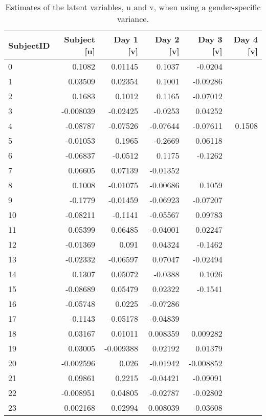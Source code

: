 \begin{table}[ht]
\centering
\caption{Estimates of the latent variables, u and v, when using a gender-specific variance.} 
\label{tab:uv_table2}
\begin{tabular}{lrrrrr}
  \hline
SubjectID & Subject [u] & Day 1 [v] & Day 2 [v] & Day 3 [v] & Day 4 [v] \\ 
  \hline
\hline
0 & 0.1082 & 0.01145 & 0.1037 & -0.0204 &  \\ 
  1 & 0.03509 & 0.02354 & 0.1001 & -0.09286 &  \\ 
  2 & 0.1683 & 0.1012 & 0.1165 & -0.07012 &  \\ 
  3 & -0.008039 & -0.02425 & -0.0253 & 0.04252 &  \\ 
  4 & -0.08787 & -0.07526 & -0.07644 & -0.07611 & 0.1508 \\ 
  5 & -0.01053 & 0.1965 & -0.2669 & 0.06118 &  \\ 
  6 & -0.06837 & -0.0512 & 0.1175 & -0.1262 &  \\ 
  7 & 0.06605 & 0.07139 & -0.01352 &  &  \\ 
  8 & 0.1008 & -0.01075 & -0.00686 & 0.1059 &  \\ 
  9 & -0.1779 & -0.01459 & -0.06923 & -0.07207 &  \\ 
  10 & -0.08211 & -0.1141 & -0.05567 & 0.09783 &  \\ 
  11 & 0.05399 & 0.06485 & -0.04001 & 0.02247 &  \\ 
  12 & -0.01369 & 0.091 & 0.04324 & -0.1462 &  \\ 
  13 & -0.02332 & -0.06597 & 0.07047 & -0.02494 &  \\ 
  14 & 0.1307 & 0.05072 & -0.0388 & 0.1026 &  \\ 
  15 & -0.08689 & 0.05479 & 0.02322 & -0.1541 &  \\ 
  16 & -0.05748 & 0.0225 & -0.07286 &  &  \\ 
  17 & -0.1143 & -0.05178 & -0.04839 &  &  \\ 
  18 & 0.03167 & 0.01011 & 0.008359 & 0.009282 &  \\ 
  19 & 0.03005 & -0.009388 & 0.02192 & 0.01379 &  \\ 
  20 & -0.002596 & 0.026 & -0.01942 & -0.008852 &  \\ 
  21 & 0.09861 & 0.2215 & -0.04421 & -0.09091 &  \\ 
  22 & -0.008951 & 0.04805 & -0.02787 & -0.02802 &  \\ 
  23 & 0.002168 & 0.02994 & 0.008039 & -0.03608 &  \\ 

\end{tabular}
\end{table}
